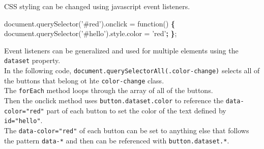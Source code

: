 \documentclass[]{book}
\newenvironment{Shaded}{\begin{snugshade}}{\end{snugshade}}
\newcommand{\ExtensionTok}[1]{#1}
\newcommand{\KeywordTok}[1]{\textcolor[rgb]{0.13,0.29,0.53}{\textbf{#1}}}
\newcommand{\NormalTok}[1]{#1}
\newcommand{\StringTok}[1]{\textcolor[rgb]{0.31,0.60,0.02}{#1}}
\begin{document}
CSS styling can be changed using javascript event listeners.

\begin{Shaded}
\begin{Highlighting}[]
\ExtensionTok{document.querySelector}\NormalTok{(}\StringTok{'#red'}\NormalTok{)}\ExtensionTok{.onclick}\NormalTok{ = function() }\KeywordTok{\{}    
    \ExtensionTok{document.querySelector}\NormalTok{(}\StringTok{'#hello'}\NormalTok{)}\ExtensionTok{.style.color}\NormalTok{ = }\StringTok{'red'}\KeywordTok{;}
\KeywordTok{\}}\NormalTok{;                                                       }
\end{Highlighting}
\end{Shaded}

Event listeners can be generalized and used for multiple elements using the \texttt{dataset} property.\\
In the following code, \texttt{document.querySelectorAll(\textquotesingle{}.color-change\textquotesingle{})} selects all of the buttons that belong ot hte \texttt{color-change} class.\\
The \texttt{forEach} method loops through the array of all of the buttons.\\
Then the onclick method uses \texttt{button.dataset.color} to reference the \texttt{data-color="red"} part of each button to set the color of the text defined by \texttt{id="hello"}.\\
The \texttt{data-color="red"} of each button can be set to anything else that follows the pattern \texttt{data-*} and then can be referenced with \texttt{button.dataset.*}.
\end{document}
